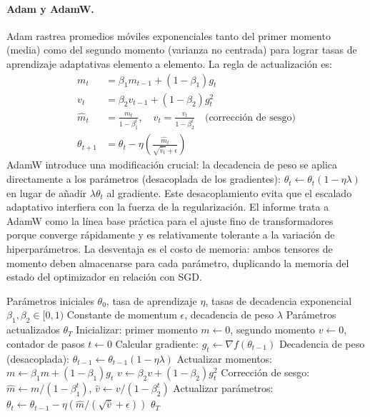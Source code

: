 \documentclass[11pt,a4paper]{article}
\begin{document}
\paragraph{Adam y AdamW.}
Adam rastrea promedios móviles exponenciales tanto del primer momento (media) como del segundo momento (varianza no centrada) para lograr tasas de aprendizaje adaptativas elemento a elemento. La regla de actualización es:
\begin{align}
m_t &= \beta_1 m_{t-1} + (1-\beta_1) g_t \\
v_t &= \beta_2 v_{t-1} + (1-\beta_2) g_t^2 \\
\hat{m}_t &= \frac{m_t}{1-\beta_1^t}, \quad \hat{v}_t = \frac{v_t}{1-\beta_2^t} \quad \text{(corrección de sesgo)} \\
\theta_{t+1} &= \theta_t - \eta \left(\frac{\hat{m}_t}{\sqrt{\hat{v}_t}+\epsilon}\right)
\end{align}
AdamW introduce una modificación crucial: la decadencia de peso se aplica directamente a los parámetros (desacoplada de los gradientes): $\theta_t \gets \theta_t(1-\eta\lambda)$ en lugar de añadir $\lambda\theta_t$ al gradiente. Este desacoplamiento evita que el escalado adaptativo interfiera con la fuerza de la regularización. El informe trata a AdamW como la línea base práctica para el ajuste fino de transformadores porque converge rápidamente y es relativamente tolerante a la variación de hiperparámetros. La desventaja es el costo de memoria: ambos tensores de momento deben almacenarse para cada parámetro, duplicando la memoria del estado del optimizador en relación con SGD.

\begin{algorithm}[H]
\caption{AdamW (Adam con Decadencia de Peso Desacoplada)}
\label{alg:adamw}
\begin{algorithmic}[1]
\Require Parámetros iniciales $\theta_0$, tasa de aprendizaje $\eta$, tasas de decadencia exponencial $\beta_1, \beta_2 \in [0,1)$
\Require Constante de momentum $\epsilon$, decadencia de peso $\lambda$
\Ensure Parámetros actualizados $\theta_T$
\State Inicializar: primer momento $m \gets 0$, segundo momento $v \gets 0$, contador de pasos $t \gets 0$
    \State Calcular gradiente: $g_t \gets \nabla f(\theta_{t-1})$
    \State Decadencia de peso (desacoplada): $\theta_{t-1} \gets \theta_{t-1}(1 - \eta\lambda)$
    \State Actualizar momentos: $m \gets \beta_1 m + (1-\beta_1) g_t$
    \State $v \gets \beta_2 v + (1-\beta_2) g_t^2$
    \State Corrección de sesgo: $\hat{m} \gets m / (1 - \beta_1^t)$, $\hat{v} \gets v / (1 - \beta_2^t)$
    \State Actualizar parámetros: $\theta_t \gets \theta_{t-1} - \eta (\hat{m} / (\sqrt{\hat{v}} + \epsilon))$
\EndFor
\Return $\theta_T$
\end{algorithmic}
\end{algorithm}
\end{document}
